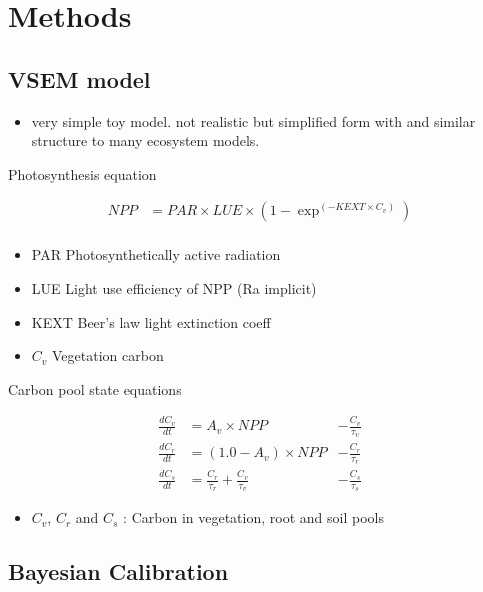 \documentclass[]{article}
\providecommand{\tightlist}{%
  \setlength{\itemsep}{0pt}\setlength{\parskip}{0pt}}
\begin{document}
\section{Methods}\label{methods}

\subsection{VSEM model}\label{vsem-model}

\begin{itemize}
\tightlist
\item
  very simple toy model. not realistic but simplified form with and
  similar structure to many ecosystem models.
\end{itemize}

Photosynthesis equation

\begin{align}
NPP &= PAR \times LUE \times (1 - \exp^{(-KEXT \times C_v)})\\
\end{align}

\begin{itemize}
\tightlist
\item
  PAR Photosynthetically active radiation
\item
  LUE Light use efficiency of NPP (Ra implicit)
\item
  KEXT Beer's law light extinction coeff
\item
  \(C_v\) Vegetation carbon
\end{itemize}

Carbon pool state equations

\begin{align}
\frac{dC_v}{dt}  &= A_v \times NPP &- \frac{C_v}{\tau_v} \\
\frac{dC_r}{dt}  &= (1.0-A_v) \times NPP &- \frac{C_r}{\tau_r}\\
\frac{dC_s}{dt}  &= \frac{C_r}{\tau_r} + \frac{C_v}{\tau_v} &- \frac{C_s}{\tau_s}
\end{align}

\begin{itemize}
\tightlist
\item
  \(C_v\), \(C_r\) and \(C_s\) : Carbon in vegetation, root and soil
  pools
\end{itemize}

\subsection{Bayesian Calibration}\label{bayesian-calibration}
\end{document}

